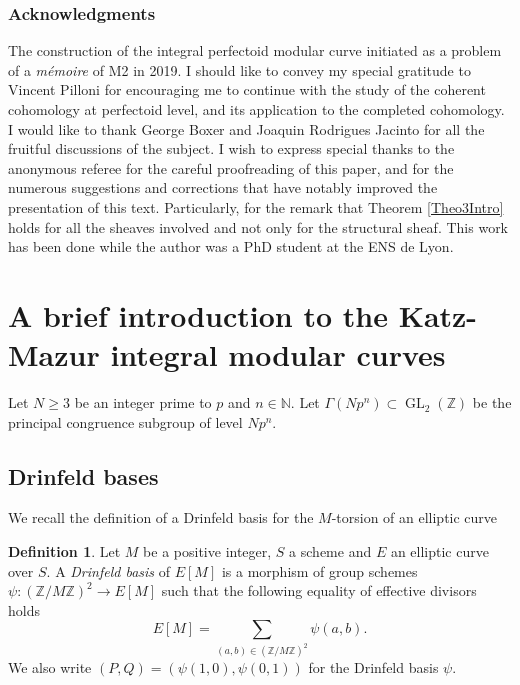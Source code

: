 \documentclass[JEP,XML,SOM,Unicode,published]{cedram}
\numberwithin{equation}{section}
\theoremstyle{definition}
\newtheorem{definition}[prop]{Definition}
\newcommand{\bb}[1]{\mathbb{#1}}
\DeclareMathOperator{\GL}{GL}
\begin{document}
\subsubsection*{Acknowledgments} The construction of the integral perfectoid modular curve initiated as a problem of a \textit{mémoire} of M2 in 2019. I should like to convey my special gratitude to Vincent Pilloni for encouraging me to continue with the study of the coherent cohomology at perfectoid level, and its application to the completed cohomology. I would like to thank George Boxer and Joaquin Rodrigues Jacinto for all the fruitful discussions of the subject. I wish to express special thanks to the anonymous referee for the careful proofreading of this paper, and for the numerous suggestions and corrections that have notably improved the presentation of this text. Particularly, for the remark that Theorem \ref{Theo3Intro} holds for all the sheaves involved and not only for the structural sheaf. This work has been done while the author was a PhD student at the ENS de Lyon.

\section{A brief introduction to the Katz-Mazur integral modular curves}

\label{RecallsModularCurves}

Let $N\geq 3$ be an integer prime to $p$ and $n\in \bb{N}$. Let $\Gamma(Np^n)\subset \GL_2(\bb{Z})$ be the principal congruence subgroup of level $Np^n$.
\subsection*{Drinfeld bases}

We recall the definition of a Drinfeld basis for the $M$-torsion of an elliptic curve

\begin{definition}
Let $M$ be a positive integer, $S$ a scheme and $E$ an elliptic curve over $S$. A \textit{Drinfeld basis} of $E[M]$ is a morphism of group schemes $ \psi:(\bb{Z}/M\bb{Z})^2\to E[M] $ such that the following equality of effective divisors holds
\begin{equation}
\label{eqDrinfeldbasis}
E[M]=\sum_{(a,b)\in (\bb{Z}/M\bb{Z})^2} \psi(a,b).
\end{equation}
We also write $(P,Q)=(\psi(1,0), \psi(0,1))$ for the Drinfeld basis $\psi$.
\end{definition}
\end{document}
